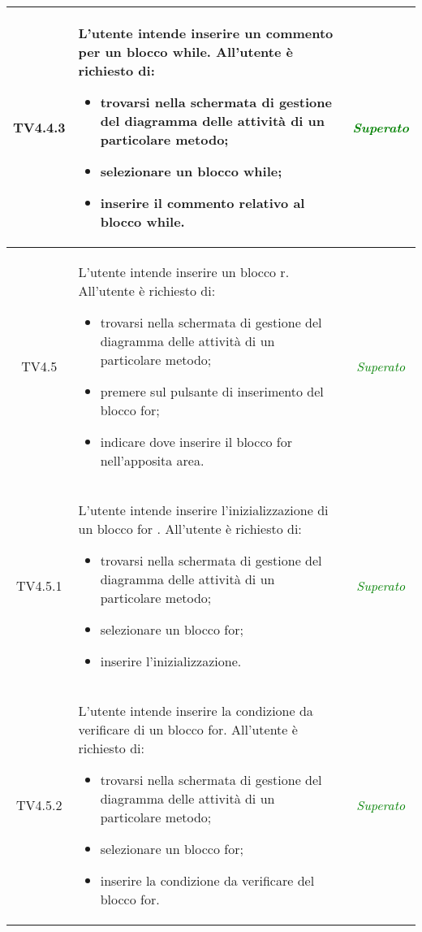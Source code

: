 \begin{longtable}{|c|>{}m{8cm}|c|}
\hypertarget{TV4.4.3}{TV4.4.3} & L'utente intende inserire un commento per un blocco while.
All'utente è richiesto di:
\begin{itemize}
	\item trovarsi nella schermata di gestione del diagramma delle attività di un particolare metodo;
	\item selezionare un blocco while;
	\item inserire il commento relativo al blocco while.
\end{itemize} & \textcolor{Green}{\textit{Superato}}\\ \hline

\hypertarget{TV4.5}{TV4.5} & L'utente intende inserire un blocco r.
All'utente è richiesto di:
\begin{itemize}
	\item trovarsi nella schermata di gestione del diagramma delle attività di un particolare metodo;
	\item premere sul pulsante di inserimento del blocco for;
	\item indicare dove inserire il blocco for nell'apposita area.
\end{itemize} & \textcolor{Green}{\textit{Superato}}\\ \hline

\hypertarget{TV4.5.1}{TV4.5.1} & L'utente intende inserire l'inizializzazione di un blocco for .
All'utente è richiesto di:
\begin{itemize}
	\item trovarsi nella schermata di gestione del diagramma delle attività di un particolare metodo;
	\item selezionare un blocco for;
	\item inserire l'inizializzazione.
\end{itemize} & \textcolor{Green}{\textit{Superato}}\\ \hline

\hypertarget{TV4.5.2}{TV4.5.2} & L'utente intende inserire la condizione da verificare di un blocco for.
All'utente è richiesto di:
\begin{itemize}
	\item trovarsi nella schermata di gestione del diagramma delle attività di un particolare metodo;
	\item selezionare un blocco for;
	\item inserire la condizione da verificare del blocco for.
\end{itemize} & \textcolor{Green}{\textit{Superato}}\\ \hline


\end{longtable}
